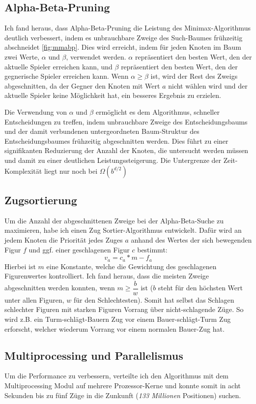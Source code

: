 \documentclass[
  manuscript=article,  %
  layout=publish,  %
  year=2023,
  volume=1,
]{extra/joas}
\begin{document}
\subsection{Alpha-Beta-Pruning}
Ich fand heraus, dass Alpha-Beta-Pruning \cite{abp} die Leistung des Minimax-Algorithmus deutlich verbessert, indem es unbrauchbare Zweige des Such-Baumes frühzeitig abschneidet \ref{fig:mmabp}. Dies wird erreicht, indem für jeden Knoten im Baum zwei Werte, $\alpha$ und $\beta$, verwendet werden. $\alpha$ repräsentiert den besten Wert, den der aktuelle Spieler erreichen kann, und $\beta$ repräsentiert den besten Wert, den der gegnerische Spieler erreichen kann. Wenn $\alpha \geq \beta$ ist, wird der Rest des Zweigs abgeschnitten, da der Gegner den Knoten mit Wert $a$ nicht wählen wird und der aktuelle Spieler keine Möglichkeit hat, ein besseres Ergebnis zu erzielen.

Die Verwendung von $\alpha$ und $\beta$ ermöglicht es dem Algorithmus, schneller Entscheidungen zu treffen, indem unbrauchbare Zweige des Entscheidungsbaums und der damit verbundenen untergeordneten Baum-Struktur des Entscheidungsbaumes frühzeitig abgeschnitten werden. Dies führt zu einer signifikanten Reduzierung der Anzahl der Knoten, die untersucht werden müssen und damit zu einer deutlichen Leistungssteigerung. Die Untergrenze der Zeit-Komplexität liegt nur noch bei $\Omega(b^{d/2})$

\subsection{Zugsortierung}
Um die Anzahl der abgeschnittenen Zweige bei der Alpha-Beta-Suche zu maximieren, habe ich einen Zug Sortier-Algorithmus entwickelt. Dafür wird an jedem Knoten die Priorität jedes Zuges $a$ anhand des Wertes der sich bewegenden Figur $f$ und ggf. einer geschlagenen Figur $c$ bestimmt:
\[v_a = c_a * m - f_a\]
Hierbei ist $m$ eine Konstante, welche die Gewichtung des geschlagenen Figurenwertes kontrolliert. Ich fand heraus, dass die meisten Zweige abgeschnitten werden konnten, wenn $m \geq \dfrac{b}{w}$ ist ($b$ steht für den höchsten Wert unter allen Figuren, $w$ für den Schlechtesten). Somit hat selbst das Schlagen schlechter Figuren mit starken Figuren Vorrang über nicht-schlagende Züge. So wird z.B. ein Turm-schlägt-Bauern Zug vor einem Bauer-schlägt-Turm Zug erforscht, welcher wiederum Vorrang vor einem normalen Bauer-Zug hat.


\subsection{Multiprocessing und Parallelismus}
Um die Performance zu verbessern, verteilte ich den Algorithmus mit dem Multiprocessing Modul auf mehrere Prozessor-Kerne und konnte somit in acht Sekunden bis zu fünf Züge in die Zunkunft (\textit{133 Millionen} Positionen) suchen. 
\end{document}
